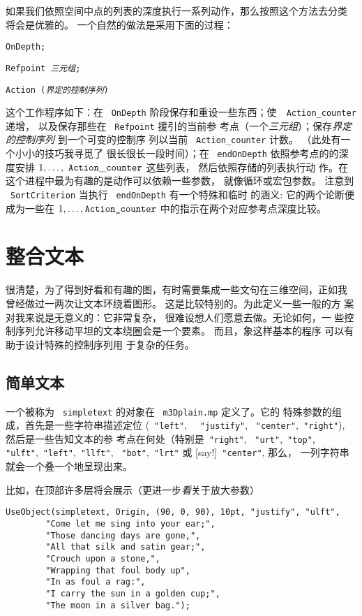 \documentclass[a4paper,12pt]{article}
\begin{document}
如果我们依照空间中点的列表的深度执行一系列动作，那么按照这个方法去分类
将会是优雅的。 一个自然的做法是采用下面的过程：

{\tt OnDepth;}

{\tt Refpoint {\it 三元组};}

{\tt Action ({\it 界定的控制序列})}


\noindent
这个工作程序如下：在 ~{\tt OnDepth} 阶段保存和重设一些东西；使~{\tt
  Action\_counter} 递增，  以及保存那些在 ~{\tt Refpoint} 援引的当前参
考点（一个{\it 三元组}）；保存{\it 界定的控制序列 }到一个可变的控制序
列以当前 ~{\tt Action\_counter} 计数。 （此处有一个小小的技巧我寻觅了 
很长很长一段时间）；在 ~{\tt endOnDepth}  依照参考点的的深度安排
$1,\dots,~{\tt  Action\_counter}$ 这些列表， 然后依照存储的列表执行动
作。在这个进程中最为有趣的是动作可以依赖一些参数， 就像循环或宏包参数。
注意到 ~{\tt SortCriterion} 当执行 ~{\tt endOnDepth}  有一个特殊和临时
的涵义: 它的两个论断便成为一些在 $\hbox{1},\dots,  \hbox{\tt
  Action\_counter}$ 中的指示在两个对应参考点深度比较。  

\section{整合文本}
很清楚，为了得到好看和有趣的图，有时需要集成一些文句在三维空间，正如我 
曾经做过一两次让文本环绕着图形。 这是比较特别的。为此定义一些一般的方
案对我来说是无意义的：它非常复杂， 很难设想人们愿意去做。无论如何，一
些控制序列允许移动平坦的文本绕圈会是一个要素。 而且，象这样基本的程序
可以有助于设计特殊的控制序列用 于复杂的任务。

\subsection{简单文本}
一个被称为 ~{\tt simpletext} 的对象在 ~{\tt m3Dplain.mp} 定义了。它的 
特殊参数的组成，首先是一些字符串描述定位  (~{\tt"left"}, ~{\tt
  "justify"}, ~{\tt "center"},~{\tt "right"}), 然后是一些告知文本的参
考点在何处（特别是~{\tt "right"}, ~{\tt "urt"},~{\tt "top"},~{\tt
  "ulft"},~{\tt "left"},~{\tt "llft"}, ~{\tt "bot"},~{\tt "lrt"} 或
[say!]~{\tt "center"}, 那么， 一列字符串就会一个叠一个地呈现出来。 

比如，在顶部许多层将会展示（更进一步{\it 看}关于放大参数）

\begin{verbatim}
UseObject(simpletext, Origin, (90, 0, 90), 10pt, "justify", "ulft",
		"Come let me sing into your ear;",
		"Those dancing days are gone,",
		"All that silk and satin gear;",
		"Crouch upon a stone,",
		"Wrapping that foul body up",
		"In as foul a rag:",
		"I carry the sun in a golden cup;",
		"The moon in a silver bag.");
\end{verbatim}
\end{document}
